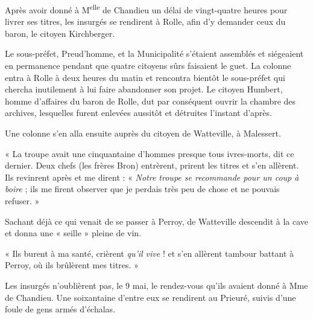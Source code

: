 \documentclass[french,twoside]{book} %
\newenvironment{quoteblock}%
  {\begin{quoting}}
  {\end{quoting}}
\newenvironment{quotebar}{%
    \def\FrameCommand{{\color{rubric!10!}\vrule width 0.5em} \hspace{0.9em}}%
    \def\OuterFrameSep{\itemsep} %
    \MakeFramed {\advance\hsize-\width \FrameRestore}
  }%
  {%
    \endMakeFramed
  }
\renewenvironment{quoteblock}%
  {%
    \savenotes
    \setstretch{0.9}
    \begin{quotebar}
  }
  {%
    \end{quotebar}
    \spewnotes
  }
\begin{document}
\noindent Après avoir donné à M\textsuperscript{elle} de Chandieu un délai de vingt-quatre heures pour livrer ses titres, les insurgés se rendirent à Rolle, afin d’y demander ceux du baron, le citoyen Kirchberger.\par
Le sous-préfet, Preud’homme, et la Municipalité s’étaient assemblés et siégeaient en permanence pendant que quatre citoyens sûrs faisaient le guet. La colonne entra à Rolle à deux heures du matin et rencontra bientôt le sous-préfet qui chercha inutilement à lui faire abandonner son projet. Le citoyen Humbert, homme d’affaires du baron de Rolle, dut par conséquent ouvrir la chambre des archives, lesquelles furent enlevées aussitôt et détruites l’instant d’après.\par
Une colonne s’en alla ensuite auprès du citoyen de Watteville, à Malessert.\par

\begin{quoteblock}
\noindent « La troupe avait une cinquantaine d’hommes presque tous ivres-morts, dit ce dernier. Deux chefs (les frères Bron) entrèrent, prirent les titres et s’en allèrent. Ils revinrent après et me dirent : « \emph{Notre troupe se recommande pour un coup à boire} ; ils me firent observer que je perdais très peu de chose et ne pouvais refuser. »\end{quoteblock}

\noindent Sachant déjà ce qui venait de se passer à Perroy, de Watteville descendit à la cave et donna une « seille » pleine de vin.\par

\begin{quoteblock}
\noindent « Ils burent à ma santé, crièrent \emph{qu’il vive} ! et s’en allèrent tambour battant à Perroy, où ils brûlèrent mes titres. »\end{quoteblock}

\noindent Les insurgés n’oublièrent pas, le 9 mai, le rendez-vous qu’ils avaient donné à Mme de Chandieu. Une soixantaine d’entre eux se rendirent au Prieuré, suivis d’une foule de gens armés d’échalas.\par
\end{document}
